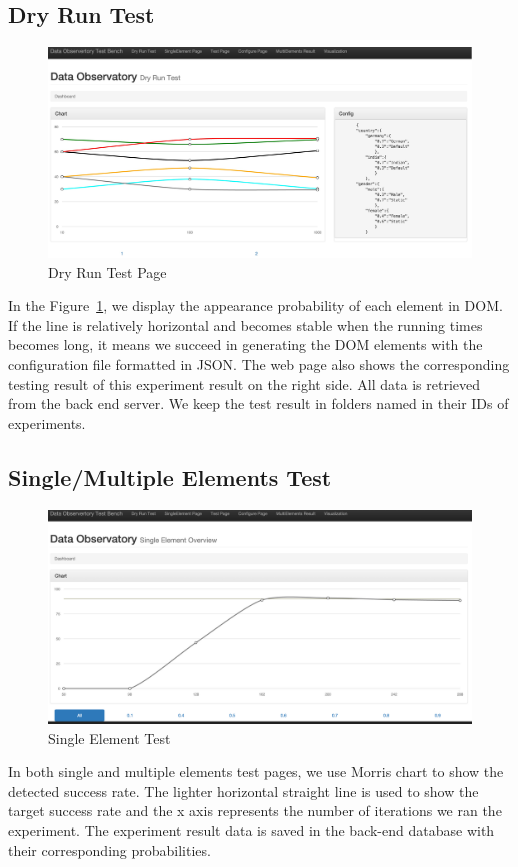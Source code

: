 \documentclass[fleqn,12pt]{SelfArx} %
\begin{document}
\subsection{Dry Run Test}
\begin{figure}[h!]
	\includegraphics[width=\linewidth]{dryruntest.jpg}
    \caption{Dry Run Test Page}
    \label{fig:dryrun}
\end{figure}
In the Figure~\ref{fig:dryrun}, we display the appearance probability of each element in DOM. If the line is relatively horizontal and becomes stable when the running times becomes long, it means we succeed in generating the DOM elements with the configuration file formatted in JSON. The web page also shows the corresponding testing result of this experiment result on the right side. All data is retrieved from the back end server. We keep the test result in folders named in their IDs of experiments.

\subsection{Single/Multiple Elements Test}
\begin{figure}[h!]
	\includegraphics[width=\linewidth]{singleelement.jpg}
    \caption{Single Element Test}
    \label{fig:singleElementTest}
\end{figure}
In both single and multiple elements test pages, we use Morris chart to show the detected success rate. The lighter horizontal straight line is used to show the target success rate and the x axis represents the number of iterations we ran the experiment. The experiment result data is saved in the back-end database with their corresponding probabilities.
\end{document}
